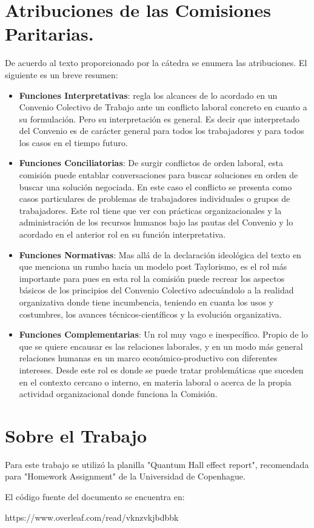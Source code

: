 \documentclass[a4paper, 12pt]{article}
\begin{document}
\section{Atribuciones de las Comisiones Paritarias.}
De acuerdo al texto proporcionado por la cátedra se enumera las atribuciones. El siguiente es un breve resumen:

\begin{itemize}
\item \textbf{Funciones Interpretativas}: regla los alcances de lo acordado en un Convenio Colectivo de Trabajo ante un conflicto laboral concreto en cuanto a su formulación. Pero su interpretación es general. Es decir que interpretado del Convenio es de carácter general para todos los trabajadores y para todos los casos en el tiempo futuro.

\item \textbf{Funciones Conciliatorias}: De surgir conflictos de orden laboral, esta comisión puede entablar conversaciones para buscar soluciones en orden de buscar una solución negociada. En este caso el conflicto se presenta como casos particulares de problemas de trabajadores individuales o grupos de trabajadores. Este rol tiene que ver con prácticas organizacionales y la administración de los recursos humanos bajo las pautas del Convenio y lo acordado en el anterior rol en su función interpretativa. 

\item \textbf{Funciones Normativas}: Mas allá de la declaración ideológica del texto en que menciona un rumbo hacia un modelo post Taylorismo, es el rol más importante para pues en esta rol la comisión puede recrear los aspectos básicos de los principios del Convenio Colectivo adecuándolo a la realidad organizativa donde tiene incumbencia, teniendo en cuanta los usos y costumbres, los avances técnicos-científicos y la evolución organizativa.

\item \textbf{Funciones Complementarias}: Un rol muy vago e inespecífico. Propio de lo que se quiere encausar es las relaciones laborales, y en un modo más general relaciones humanas en un marco económico-productivo con diferentes intereses. Desde este rol es donde se puede tratar problemáticas que suceden en el contexto cercano o interno, en materia laboral o acerca de la propia actividad organizacional donde funciona la Comisión. 

\end{itemize}



\section{Sobre el Trabajo}
Para este trabajo se utilizó la planilla "Quantum Hall effect report", recomendada para "Homework Assignment" de la Universidad de Copenhague.

El código fuente del documento se encuentra en:

https://www.overleaf.com/read/vknzvkjbdbbk
\end{document}

